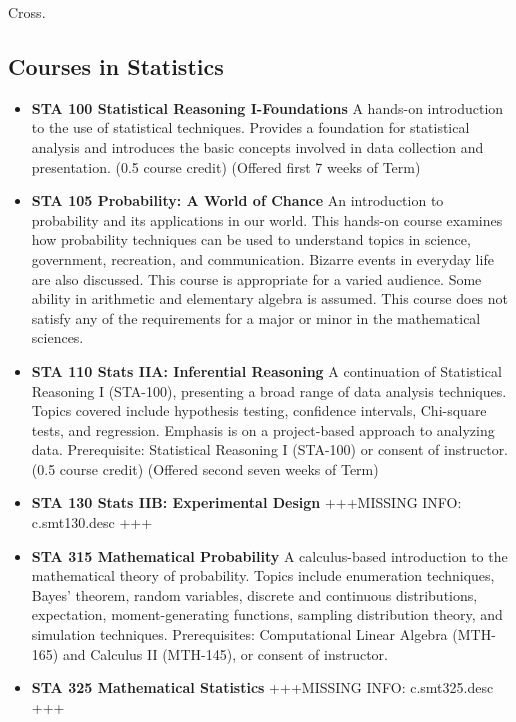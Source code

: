 \documentclass[
  letterpaper,
]{scrbook}
\providecommand{\tightlist}{%
  \setlength{\itemsep}{0pt}\setlength{\parskip}{0pt}}
\begin{document}
Cross.

\subsection{Courses in Statistics}\label{courses-in-statistics}

\begin{itemize}
\tightlist
\item
  \textbf{STA 100 Statistical Reasoning I-Foundations} A hands-on
  introduction to the use of statistical techniques. Provides a
  foundation for statistical analysis and introduces the basic concepts
  involved in data collection and presentation. (0.5 course credit)
  (Offered first 7 weeks of Term)\\
\item
  \textbf{STA 105 Probability: A World of Chance} An introduction to
  probability and its applications in our world. This hands-on course
  examines how probability techniques can be used to understand topics
  in science, government, recreation, and communication. Bizarre events
  in everyday life are also discussed. This course is appropriate for a
  varied audience. Some ability in arithmetic and elementary algebra is
  assumed. This course does not satisfy any of the requirements for a
  major or minor in the mathematical sciences.
\item
  \textbf{STA 110 Stats IIA: Inferential Reasoning} A continuation of
  Statistical Reasoning I (STA-100), presenting a broad range of data
  analysis techniques. Topics covered include hypothesis testing,
  confidence intervals, Chi-square tests, and regression. Emphasis is on
  a project-based approach to analyzing data. Prerequisite: Statistical
  Reasoning I (STA-100) or consent of instructor. (0.5 course credit)
  (Offered second seven weeks of Term)
\item
  \textbf{STA 130 Stats IIB: Experimental Design} +++MISSING INFO:
  c.smt130.desc +++
\item
  \textbf{STA 315 Mathematical Probability} A calculus-based
  introduction to the mathematical theory of probability. Topics include
  enumeration techniques, Bayes' theorem, random variables, discrete and
  continuous distributions, expectation, moment-generating functions,
  sampling distribution theory, and simulation techniques.
  Prerequisites: Computational Linear Algebra (MTH-165) and Calculus II
  (MTH-145), or consent of instructor.
\item
  \textbf{STA 325 Mathematical Statistics} +++MISSING INFO:
  c.smt325.desc +++
\end{itemize}
\end{document}
